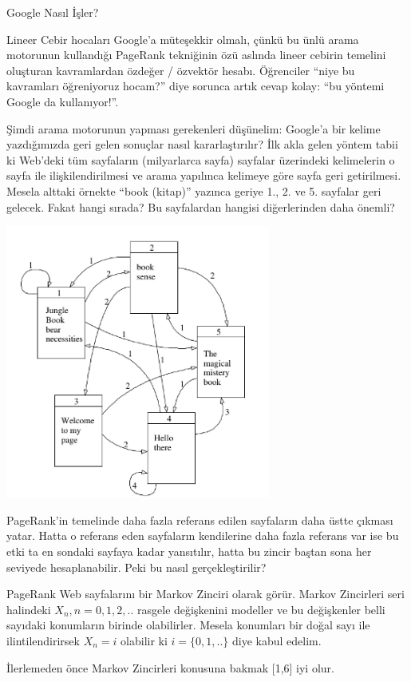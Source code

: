 \documentclass[12pt,fleqn]{article}\usepackage{../../common}
\begin{document}
Google Nasıl İşler? 

Lineer Cebir hocaları Google'a müteşekkir olmalı, çünkü bu ünlü arama
motorunun kullandığı PageRank tekniğinin özü aslında lineer cebirin
temelini oluşturan kavramlardan özdeğer / özvektör hesabı. Öğrenciler
``niye bu kavramları öğreniyoruz hocam?''  diye sorunca artık cevap
kolay: ``bu yöntemi Google da kullanıyor!''.

Şimdi arama motorunun yapması gerekenleri düşünelim: Google'a bir kelime
yazdığımızda geri gelen sonuçlar nasıl kararlaştırılır? İlk akla gelen
yöntem tabii ki Web'deki tüm sayfaların (milyarlarca sayfa) sayfalar
üzerindeki kelimelerin o sayfa ile ilişkilendirilmesi ve arama yapılınca
kelimeye göre sayfa geri getirilmesi. Mesela alttaki örnekte ``book
(kitap)'' yazınca geriye 1., 2. ve 5. sayfalar geri gelecek. Fakat hangi
sırada? Bu sayfalardan hangisi diğerlerinden daha önemli?

\includegraphics[height=9cm]{pg2.png}

PageRank'in temelinde daha fazla referans edilen sayfaların daha üstte
çıkması yatar. Hatta o referans eden sayfaların kendilerine daha fazla
referans var ise bu etki ta en sondaki sayfaya kadar yansıtılır, hatta bu
zincir baştan sona her seviyede hesaplanabilir. Peki bu nasıl
gerçekleştirilir?

PageRank Web sayfalarını bir Markov Zinciri olarak görür. Markov Zincirleri
seri halindeki $X_n, n=0,1,2,..$ rasgele değişkenini modeller ve bu
değişkenler belli sayıdaki konumların birinde olabilirler. Mesela konumları
bir doğal sayı ile ilintilendirirsek $X_n = i$ olabilir ki $i=\{0,1,..\}$
diye kabul edelim.

İlerlemeden önce Markov Zincirleri konusuna bakmak [1,6] iyi olur.
\end{document}
